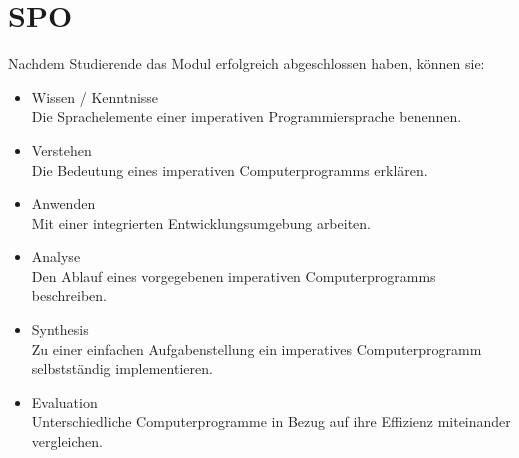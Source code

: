 \section{SPO}

    Nachdem Studierende das Modul erfolgreich abgeschlossen haben, können sie:
    \begin{itemize}
        \item Wissen / Kenntnisse\\
            Die Sprachelemente einer imperativen Programmiersprache benennen.
        \item Verstehen\\
            Die Bedeutung eines imperativen Computerprogramms erklären.
        \item Anwenden\\
            Mit einer integrierten Entwicklungsumgebung arbeiten.
        \item Analyse\\
            Den Ablauf eines vorgegebenen imperativen Computerprogramms beschreiben.
        \item Synthesis\\
            Zu einer einfachen Aufgabenstellung ein imperatives Computerprogramm selbstständig implementieren.
        \item Evaluation\\
            Unterschiedliche Computerprogramme in Bezug auf ihre Effizienz miteinander vergleichen.
    \end{itemize}
    
\newpage